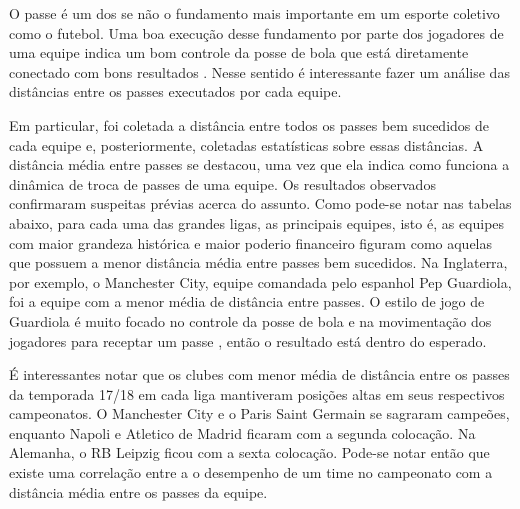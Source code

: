 \documentclass{article}
\begin{document}
O passe é um dos se não o fundamento mais importante em um esporte coletivo
como o futebol. Uma boa execução desse fundamento por parte dos jogadores
de uma equipe indica um bom controle da posse de bola que está diretamente
conectado com bons resultados \cite{cox2022linhas}. Nesse sentido é
interessante fazer um análise
das distâncias entre os passes
executados por cada equipe.

Em particular, foi coletada a distância entre todos os passes bem sucedidos de
cada equipe e, posteriormente, coletadas estatísticas sobre essas distâncias. A
distância média
entre passes se destacou, uma vez que ela indica como funciona a dinâmica de
troca de passes de uma equipe. Os resultados observados confirmaram suspeitas
prévias acerca do assunto.
Como pode-se notar nas tabelas abaixo, para cada uma das grandes ligas, as
principais equipes, isto é, as equipes com maior grandeza histórica e maior
poderio financeiro figuram como aquelas
que possuem a menor distância média entre passes bem sucedidos. Na Inglaterra,
por exemplo, o Manchester City, equipe comandada pelo espanhol Pep Guardiola,
foi a equipe com a menor média
de distância entre passes. O estilo de jogo de Guardiola é muito focado no
controle da posse de bola e na movimentação dos jogadores para receptar um
passe \cite{terzis2023pep}, então o resultado está dentro do
esperado.

É interessantes notar que os clubes com menor média de distância entre os
passes da temporada 17/18 em cada liga mantiveram posições altas em seus
respectivos campeonatos. O Manchester City e o Paris Saint Germain se sagraram
campeões, enquanto Napoli e Atletico de Madrid ficaram com a segunda colocação.
Na Alemanha, o RB Leipzig ficou com a sexta colocação. Pode-se notar então que
existe uma correlação entre a o desempenho de um time no campeonato com a
distância média entre os passes da equipe.
\end{document}
